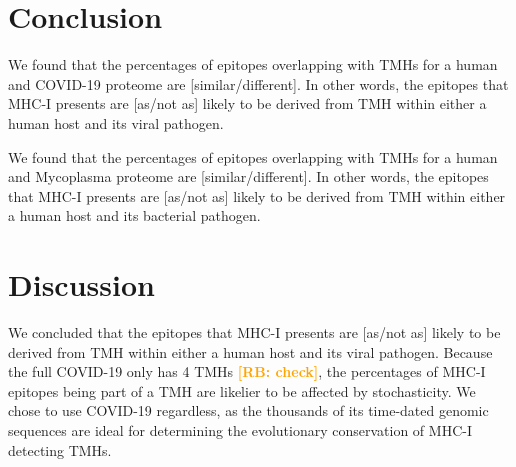 \documentclass{article}
\newcommand{\richel}[1]{\textcolor{orange}{\textbf{[RB: #1]}}}
\begin{document}



\section{Conclusion}

We found that the percentages of epitopes overlapping 
with TMHs for a human and COVID-19 proteome are 
[similar/different]. In other words, the
epitopes that MHC-I presents are [as/not as] likely 
to be derived from TMH within either a human host and its viral pathogen.

We found that the percentages of epitopes overlapping 
with TMHs for a human and Mycoplasma proteome are 
[similar/different]. In other words, the
epitopes that MHC-I presents are [as/not as] likely 
to be derived from TMH within either a human host and its bacterial pathogen.



\section{Discussion}

We concluded that the
epitopes that MHC-I presents are [as/not as] likely 
to be derived from TMH within either a human host and its viral pathogen.
Because the full COVID-19 only has 4 TMHs \richel{check}, the percentages
of MHC-I epitopes being part of a TMH are likelier to be affected by
stochasticity. We chose to use COVID-19 regardless, as the thousands
of its time-dated genomic sequences are ideal for determining the 
evolutionary conservation of MHC-I detecting TMHs. 
\end{document}

